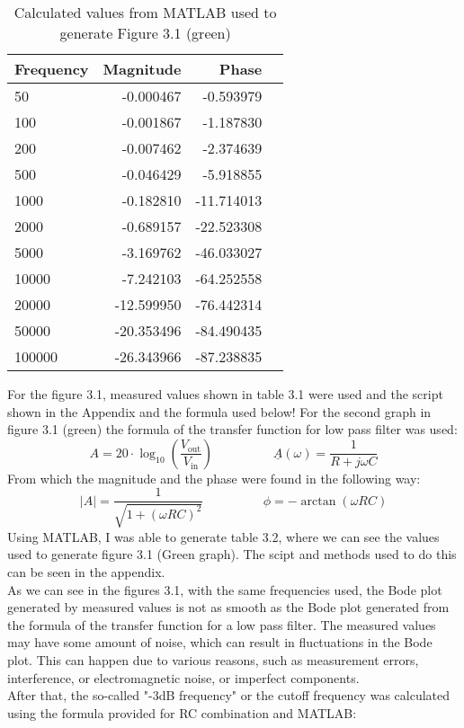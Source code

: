 \documentclass[12pt]{report}
\begin{document}
\begin{table}[!htp]\centering
\begin{tabular}{lrrr}\toprule
Frequency &Magnitude &Phase \\\midrule
50 &-0.000467 &-0.593979 \\
100 &-0.001867 &-1.187830 \\
200 &-0.007462 &-2.374639 \\
500 &-0.046429 &-5.918855 \\
1000 &-0.182810 &-11.714013 \\
2000 &-0.689157 &-22.523308 \\
5000 &-3.169762 &-46.033027 \\
10000 &-7.242103 &-64.252558 \\
20000 &-12.599950 &-76.442314 \\
50000 &-20.353496 &-84.490435 \\
100000 &-26.343966 &-87.238835 \\
\bottomrule
\end{tabular}
\caption{Calculated values from MATLAB used to generate Figure 3.1 (green)}
\end{table}
For the figure 3.1, measured values shown in table 3.1 were used and the script shown in the Appendix and the formula used below! For the second graph in figure 3.1 (green) the formula of the transfer function for low pass filter was used:
$$ A = 20 \cdot \log_{10} \left( \frac{V_{\text{out}}}{V_{\text{in}}} \right) \hspace{2cm} \underline A(\omega) =  \frac{1}{R+j \omega C} $$
From which the magnitude and the phase were found in the following way:
$$|A| = \frac{1}{\sqrt{1 + (\omega RC)^2}} \hspace{2cm} \phi = -\arctan(\omega RC) $$
Using MATLAB, I was able to generate table 3.2, where we can see the values used to generate figure 3.1 (Green graph). The scipt and methods used to do this can be seen in the appendix.\\
As we can see in the figures 3.1, with the same frequencies used, the Bode plot generated by measured values is not as smooth as the Bode plot generated from the formula of the transfer function for a low pass filter. The measured values may have some amount of noise, which can result in fluctuations in the Bode plot. This can happen due to various reasons, such as measurement errors, interference, or electromagnetic noise, or imperfect components.\\
After that, the so-called "-3dB frequency" or the cutoff frequency was calculated using the formula provided for RC combination and MATLAB:
\end{document}
